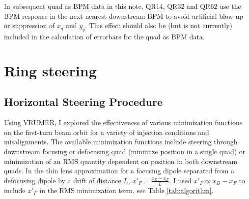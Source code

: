 

In subsequent quad as BPM data in this note, QR14, QR32 and QR62 use the BPM response in the next nearest downstream BPM to avoid artificial blow-up or suppression of $x_q$ and $y_q$. 
This effect should also be (but is not currently) included in the calculation of errorbars for the quad as BPM data.












\section{Ring steering}




\subsection{Horizontal Steering Procedure}

Using VRUMER, I explored the effectiveness of various minimization functions on the first-turn beam orbit for a variety of injection conditions and misalignments. The available minimization functions include steering through downstream focusing or defocusing quad (minimize position in a single quad) or minimization of an RMS quantity dependent on position in both downstream quads. In the thin lens approximation for a focusing dipole separated from a defocusing dipole by a drift of distance $L$, $x'_F = \frac{x_D-x_F}{L}$. I used $x'_F \propto x_D-x_F$ to include $x'_F$ in the RMS minimization term, see Table \ref{tab:algorithm}.

